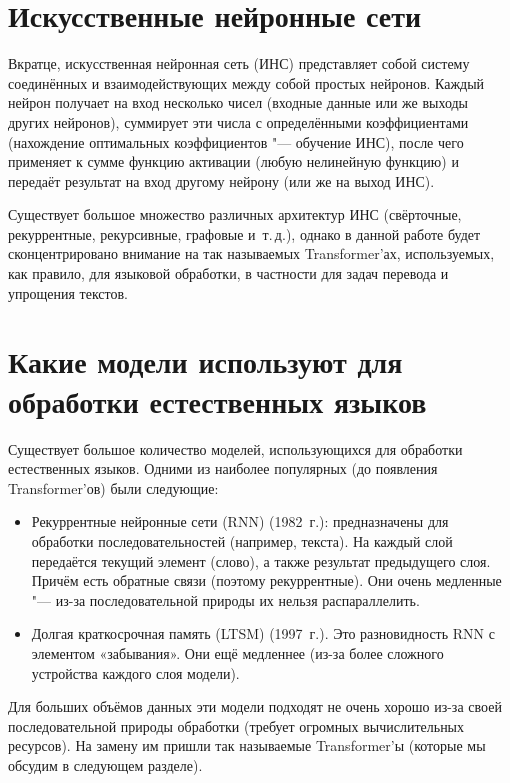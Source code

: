 \section{Искусственные нейронные сети}


Вкратце, искусственная нейронная сеть (ИНС) представляет собой систему соединённых и взаимодействующих между собой простых нейронов. Каждый нейрон получает на вход несколько чисел (входные данные или же выходы других нейронов), суммирует эти числа с определёнными коэффициентами (нахождение оптимальных коэффициентов "--- обучение ИНС), после чего применяет к сумме функцию активации (любую нелинейную функцию) и передаёт результат на вход другому нейрону (или же на выход ИНС).

Существует большое множество различных архитектур ИНС (свёрточные, рекуррентные, рекурсивные, графовые и~т.\,д.), однако в данной работе будет сконцентрировано внимание на так называемых Transformer'ах, используемых, как правило, для языковой обработки, в частности для задач перевода и упрощения текстов.


\section{Какие модели используют для обработки естественных языков}


Существует большое количество моделей, использующихся для обработки естественных языков. Одними из наиболее популярных (до появления Transformer'ов) были следующие:
\begin{itemize}%
  \item Рекуррентные нейронные сети (RNN) (1982~г.): предназначены для обработки последовательностей (например, текста).
    На каждый слой передаётся текущий элемент (слово), а также результат предыдущего слоя.
    Причём есть обратные связи (поэтому рекуррентные).
    Они очень медленные "--- из-за последовательной природы их нельзя распараллелить.
  \item Долгая краткосрочная память (LTSM) (1997~г.).
    Это разновидность RNN с элементом «забывания».
    Они ещё медленнее (из-за более сложного устройства каждого слоя модели).
\end{itemize}

Для больших объёмов данных эти модели подходят не очень хорошо из-за своей последовательной природы обработки (требует огромных вычислительных ресурсов). На замену им пришли так называемые Transformer'ы (которые мы обсудим в следующем разделе).


